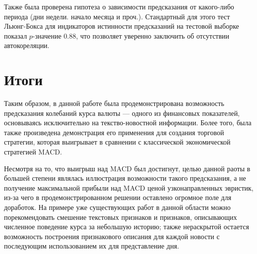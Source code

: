 \documentclass[pdftex,ptm,14pt,a4paper]{report}
\begin{document}
Также была проверена гипотеза о зависимости предсказания от какого-либо периода (дни недели. начало месяца и проч.).
Стандартный для этого тест Льюнг-Бокса\cite{ljungbox} для индикаторов истинности предсказаний на тестовой выборке
показал $p$-значение 0.88, что позволяет уверенно заключить об отсутствии автокореляции.

\chapter{Итоги}

Таким образом, в данной работе была продемонстрирована возможность предсказания колебаний курса
валюты --- одного из финансовых показателей, основываясь исключительно на текство-новостной информации.
Более того, была также произведена демонстрация его применения для создания торговой стратегии,
которая выигрывает в сравнении с классической экономической стратегией MACD.

Несмотря на то, что выигрыш над MACD был достигнут, целью данной раоты в большей степени являлась иллюстрация
возможности такого предсказания, а не получение максимальной прибыли над MACD ценой узконаправленных эвристик,
из-за чего в продемонстрированном решении оставлено огромное поле для доработок.
На примере уже существующих работ в данной области можно порекомендовать смешение текстовых признаков и признаков,
описывающих численное поведение курса за небольшую историю; также нераскрытой остается возможность построения признакового
описания для каждой новости с последующим использованием их для представление дня.

{}

\end{document}
